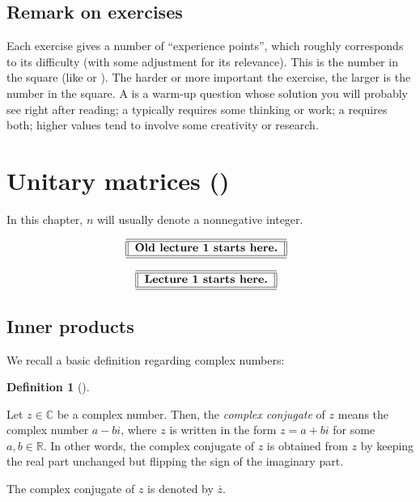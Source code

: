 \documentclass[numbers=enddot,12pt,final,onecolumn,notitlepage]{scrartcl}%
\newcounter{exer}
\numberwithin{exer}{subsection}
\theoremstyle{definition}
\newtheorem{defi}[theo]{Definition}
\newenvironment{definition}[1][]
{\begin{defi}[#1]\begin{leftbar}}
{\end{leftbar}\end{defi}}
\newenvironment{noncompile}{}{}
\begin{document}
\subsection{Remark on exercises}

Each exercise gives a number of \textquotedblleft experience
points\textquotedblright, which roughly corresponds to its difficulty (with
some adjustment for its relevance). This is the number in the square (like
 or ). The harder or more important the exercise, the larger
is the number in the square. A  is a warm-up question whose solution
you will probably see right after reading; a  typically requires some
thinking or work; a  requires both; higher values tend to involve some
creativity or research.

\newpage

\section{Unitary matrices (\cite[\S 2.1]{HorJoh13})}

In this chapter, $n$ will usually denote a nonnegative integer.

\begin{noncompile}%
\[%
\begin{tabular}
[c]{||l||}\hline\hline
\textbf{Old lecture 1 starts here.}\\\hline\hline
\end{tabular}
\ \
\]

\end{noncompile}

%

\[%
\begin{tabular}
[c]{||l||}\hline\hline
\textbf{Lecture 1 starts here.}\\\hline\hline
\end{tabular}
\ \
\]


\subsection{Inner products}

We recall a basic definition regarding complex numbers:

\begin{definition}
Let $z\in\mathbb{C}$ be a complex number. Then, the \emph{complex conjugate}
of $z$ means the complex number $a-bi$, where $z$ is written in the form
$z=a+bi$ for some $a,b\in\mathbb{R}$. In other words, the complex conjugate of
$z$ is obtained from $z$ by keeping the real part unchanged but flipping the
sign of the imaginary part.

The complex conjugate of $z$ is denoted by $\overline{z}$.
\end{definition}
\end{document}
